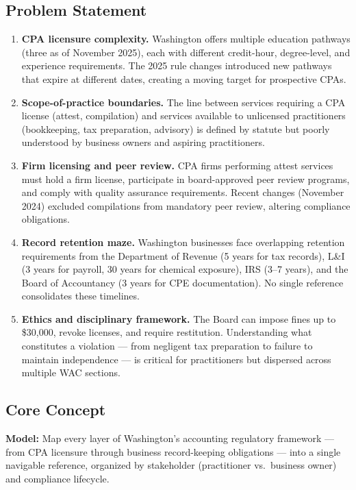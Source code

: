 \documentclass[11pt,letterpaper]{article}
\begin{document}
\subsection{Problem Statement}

\begin{enumerate}[label=\textbf{P\arabic*.}, leftmargin=2.5em]
  \item \textbf{CPA licensure complexity.} Washington offers multiple education pathways (three as of November 2025), each with different credit-hour, degree-level, and experience requirements. The 2025 rule changes introduced new pathways that expire at different dates, creating a moving target for prospective CPAs.
  \item \textbf{Scope-of-practice boundaries.} The line between services requiring a CPA license (attest, compilation) and services available to unlicensed practitioners (bookkeeping, tax preparation, advisory) is defined by statute but poorly understood by business owners and aspiring practitioners.
  \item \textbf{Firm licensing and peer review.} CPA firms performing attest services must hold a firm license, participate in board-approved peer review programs, and comply with quality assurance requirements. Recent changes (November 2024) excluded compilations from mandatory peer review, altering compliance obligations.
  \item \textbf{Record retention maze.} Washington businesses face overlapping retention requirements from the Department of Revenue (5 years for tax records), L\&I (3 years for payroll, 30 years for chemical exposure), IRS (3--7 years), and the Board of Accountancy (3 years for CPE documentation). No single reference consolidates these timelines.
  \item \textbf{Ethics and disciplinary framework.} The Board can impose fines up to \$30,000, revoke licenses, and require restitution. Understanding what constitutes a violation --- from negligent tax preparation to failure to maintain independence --- is critical for practitioners but dispersed across multiple WAC sections.
\end{enumerate}

\subsection{Core Concept}

\textbf{Model:} Map every layer of Washington's accounting regulatory framework --- from CPA licensure through business record-keeping obligations --- into a single navigable reference, organized by stakeholder (practitioner vs.\ business owner) and compliance lifecycle.
\end{document}
